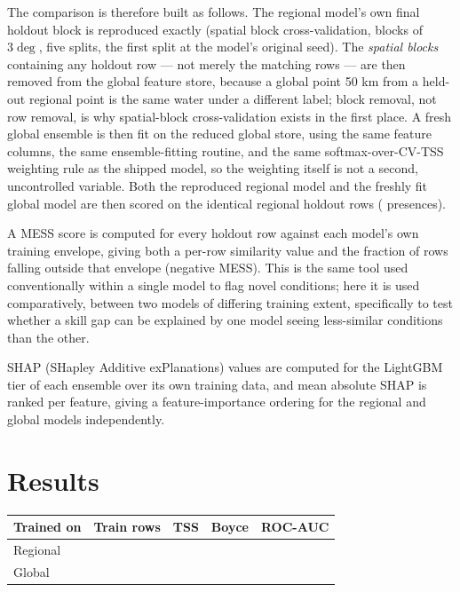 The comparison is therefore built as follows. The regional model's own final
holdout block is reproduced exactly (spatial block cross-validation, blocks
of \(3\deg\), five splits, the first split at the model's original seed). The
\emph{spatial blocks} containing any holdout row --- not merely the matching
rows --- are then removed from the global feature store, because a global
point 50 km from a held-out regional point is the same water under a
different label; block removal, not row removal, is why spatial-block
cross-validation exists in the first place. A fresh global ensemble is then
fit on the reduced global store, using the same feature columns, the same
ensemble-fitting routine, and the same softmax-over-CV-TSS weighting rule as
the shipped model, so the weighting itself is not a second, uncontrolled
variable. Both the reproduced regional model and the freshly fit global model
are then scored on the identical \NHoldout{} regional holdout rows
(\NHoldoutPos{} presences).

 A MESS score \citep{elith2010} is computed for
every holdout row against each model's own training envelope, giving both a
per-row similarity value and the fraction of rows falling outside that
envelope (negative MESS). This is the same tool used conventionally within a
single model to flag novel conditions; here it is used comparatively, between
two models of differing training extent, specifically to test whether a
skill gap can be explained by one model seeing less-similar conditions than
the other.

 SHAP (SHapley Additive exPlanations) values are
computed for the LightGBM tier of each ensemble over its own training data,
and mean absolute SHAP is ranked per feature, giving a feature-importance
ordering for the regional and global models independently.

\section{Results}
\label{sec:results}

\begin{wtable}
\centering
\tabscale
\caption{Matched-holdout comparison: \NHoldout{} identical regional rows,
scored by both ensembles. Higher is better for every column.}
\label{tab:holdout}
\begin{tabular}{lrrrr}
\toprule
Trained on & Train rows & TSS & Boyce & ROC-AUC \\
\midrule
Regional & \NRegionalTrain{} & \TSSRegion{} & \BoyceRegion{} & \ROCRegion{} \\
Global   & \NGlobalTrain{}   & \TSSGlobal{} & \BoyceGlobal{} & \ROCGlobal{} \\
\bottomrule
\end{tabular}
\end{wtable}

